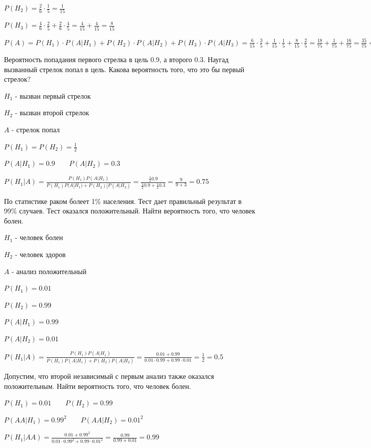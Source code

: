 \documentclass[12pt]{article}
\begin{document}
    $P(H_2) = \frac{2}{6} \cdot \frac{1}{5} = \frac{1}{15}$

    $P(H_3) = \frac{4}{6} \cdot \frac{2}{5} + \frac{2}{6} \cdot \frac{4}{5} = \frac{4}{15} + \frac{4}{15} = \frac{8}{15}$

    $P(A) = P(H_1) \cdot P(A|H_1) + P(H_2) \cdot P(A|H_2) + P(H_3) \cdot P(A|H_3) = \frac{6}{15} \cdot \frac{3}{5} + \frac{1}{15} \cdot \frac{1}{5} + \frac{8}{15} \cdot \frac{2}{5} =
    \frac{18}{75} + \frac{1}{75} + \frac{16}{75} = \frac{35}{75} = \frac{7}{15}$

     Вероятность попадания первого стрелка в цель $0.9$, а второго $0.3$. Наугад вызванный стрелок попал в цель. Какова вероятность того, что это бы первый стрелок?

    $H_1$ - вызван первый стрелок

    $H_2$ - вызван второй стрелок

    $A$ - стрелок попал

    $P(H_1) = P(H_2) = \frac{1}{2}$

    $P(A|H_1) = 0.9 \quad\quad P(A|H_2) = 0.3$

    $P(H_1 | A) = \frac{P(H_1) P(A|H_1)}{P(H_1) P(A|H_1) + P(H_2) | P(A | H_2)} = \frac{\frac{1}{2} 0.9}{\frac{1}{2} 0.9 + \frac{1}{2} 0.3} = \frac{9}{9 + 3} = 0.75$

     По статистике раком болеет 1\% населения. Тест дает правильный результат в 99\% случаев. Тест оказался положительный. Найти вероятность того, что человек болен.

    $H_1$ - человек болен

    $H_2$ - человек здоров

    $A$ - анализ положительный

    $P(H_1) = 0.01$

    $P(H_2) = 0.99$

    $P(A|H_1) = 0.99$

    $P(A|H_2) = 0.01$

    $P(H_1 | A) = \frac{P(H_1)P(A | H_1)}{P(H_1) P(A | H_1) + P(H_2) P(A | H_2)} = \frac{0.01 + 0.99}{0.01 \cdot 0.99 + 0.99 \cdot 0.01} = \frac{1}{2} = 0.5$

    Допустим, что второй независимый с первым анализ также оказался положительным. Найти вероятность того, что человек болен.

    $P(H_1) = 0.01 \quad\quad P(H_2) = 0.99$

    $P(AA|H_1) = 0.99^2 \quad\quad P(AA|H_2) = 0.01^2$

    $P(H_1 | AA) = \frac{0.01 + 0.99^2}{0.01 \cdot 0.99^2 + 0.99 \cdot 0.01^2} = \frac{0.99}{0.99 + 0.01} = 0.99$
\end{document}
